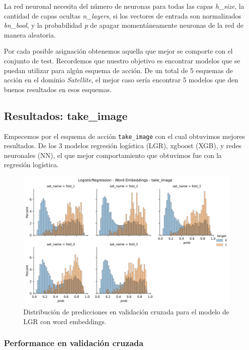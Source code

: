La red neuronal necesita del número de neuronas para todas las capas
\emph{h\_size}, la cantidad de capas ocultas \emph{n\_layers}, si los vectores
de entrada son normalizados \emph{bn\_bool}, y la probabilidad  \emph{p} de
apagar momentáneamente neuronas de la red de manera aleatoria.

Por cada posible asignación obtenemos aquella que mejor se comporte con el
conjunto de test. Recordemos que nuestro objetivo es encontrar modelos que se
puedan utilizar para algún esquema de acción. De un total de 5 esquemas de
acción en el dominio \emph{Satellite}, el mejor caso sería encontrar 5 modelos
que den buenos resultados en esos esquemas.

\subsection{Resultados: take\_image}

Empecemos por el esquema de acción \verb|take_image| con el cual obtuvimos
mejores resultados. De los 3 modelos regresión logística (LGR), xgboost (XGB), y
redes neuronales (NN), el que mejor comportamiento que obtuvimos fue con la
regresión logística. 

\begin{figure}[t!]
    \centering
    \includegraphics[width=\linewidth]{figures/results/word_embeddings/lgr/take_image/lgr_wb_take_image.png}
    \caption{Distribución de predicciones en validación cruzada para el modelo de LGR con word embeddings.}
    \label{fig:takeimage-bestmodel-distplot}
\end{figure}

\subsubsection{Performance en validación cruzada}

